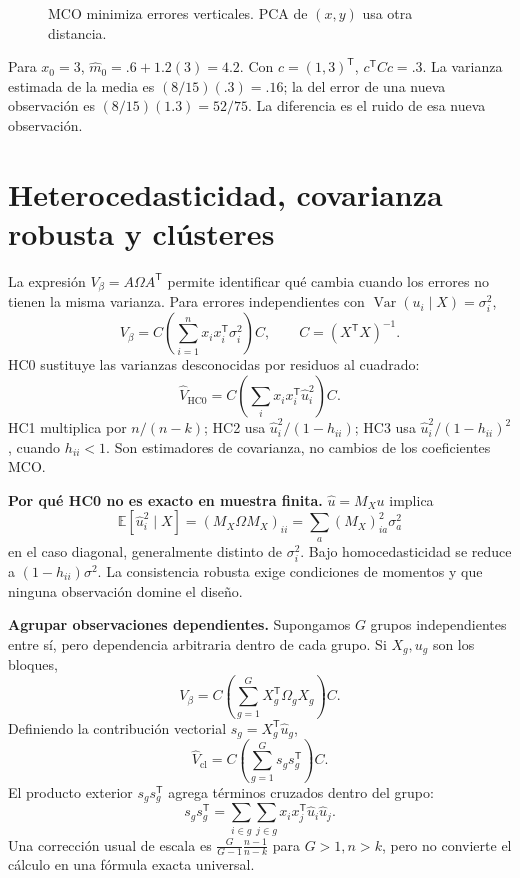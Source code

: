 \documentclass[11pt,a4paper]{article}
\newcommand{\E}{\mathbb E}
\newcommand{\T}{^{\mathsf T}}
\DeclareMathOperator{\Var}{Var}
\newcommand{\topic}[2]{\clearpage\section{#1}\label{#2}}
\theoremstyle{definition}\newtheorem{definicion}[teorema]{Definición}
\begin{document}
\begin{figure}[H]\centering
{}
\caption{MCO minimiza errores verticales. PCA de $(x,y)$ usa otra distancia.}
\end{figure}
Para $x_0=3$, $\widehat m_0=.6+1.2(3)=4.2$.
Con $c=(1,3)\T$, $c\T Cc=.3$.
La varianza estimada de la media es $(8/15)(.3)=.16$;
la del error de una nueva observación es $(8/15)(1.3)=52/75$.
La diferencia es el ruido de esa nueva observación.

\topic{Heterocedasticidad, covarianza robusta y clústeres}{s39}
La expresión $V_\beta=A\Omega A\T$ permite identificar qué cambia
cuando los errores no tienen la misma varianza.
Para errores independientes con $\Var(u_i\mid X)=\sigma_i^2$,
\[
V_\beta=C\left(\sum_{i=1}^n x_ix_i\T\sigma_i^2\right)C,\qquad
C=(X\T X)^{-1}.
\]
HC0 sustituye las varianzas desconocidas por residuos al cuadrado:
\[
\boxed{\widehat V_{\mathrm{HC0}}
=C\left(\sum_i x_ix_i\T\widehat u_i^2\right)C}.
\]
HC1 multiplica por $n/(n-k)$; HC2 usa
$\widehat u_i^2/(1-h_{ii})$; HC3 usa
$\widehat u_i^2/(1-h_{ii})^2$, cuando $h_{ii}<1$.
Son estimadores de covarianza, no cambios de los coeficientes MCO.

\textbf{Por qué HC0 no es exacto en muestra finita.}
$\widehat u=M_Xu$ implica
\[
\E[\widehat u_i^2\mid X]=(M_X\Omega M_X)_{ii}
=\sum_a (M_X)_{ia}^2\sigma_a^2
\]
en el caso diagonal, generalmente distinto de $\sigma_i^2$.
Bajo homocedasticidad se reduce a $(1-h_{ii})\sigma^2$.
La consistencia robusta exige condiciones de momentos y que ninguna
observación domine el diseño.

\textbf{Agrupar observaciones dependientes.}
Supongamos $G$ grupos independientes entre sí, pero dependencia arbitraria
dentro de cada grupo. Si $X_g,u_g$ son los bloques,
\[
V_\beta=C\left(\sum_{g=1}^GX_g\T\Omega_gX_g\right)C.
\]
Definiendo la contribución vectorial $s_g=X_g\T\widehat u_g$,
\[
\boxed{\widehat V_{\mathrm{cl}}
=C\left(\sum_{g=1}^Gs_gs_g\T\right)C}.
\]
El producto exterior $s_gs_g\T$ agrega términos cruzados dentro del grupo:
\[
s_gs_g\T=\sum_{i\in g}\sum_{j\in g}x_ix_j\T\widehat u_i\widehat u_j.
\]
Una corrección usual de escala es
$\frac{G}{G-1}\frac{n-1}{n-k}$ para $G>1,n>k$,
pero no convierte el cálculo en una fórmula exacta universal.
\end{document}
